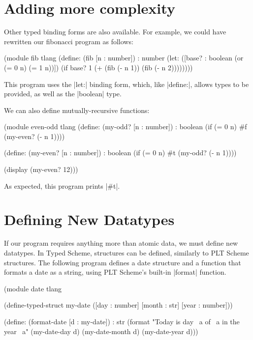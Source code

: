 \documentclass{book}
\begin{document}
\begin{schemeregion}
\section{Adding more complexity}



Other typed binding forms are also available.  For example, we could have
rewritten our fibonacci program as follows:

\begin{schemedisplay}
(module fib tlang
  (define: (fib [n : number]) : number
    (let: ([base? : boolean (or (= 0 n) (= 1 n))])
      (if base? 1
          (+ (fib (- n 1)) (fib (- n 2))))))))
\end{schemedisplay} 

This program uses the \scheme|let:| binding form, which, like
\scheme|define:|, allows types to be provided, as well as the
\scheme|boolean| type.

We can also define mutually-recursive functions:

\begin{schemedisplay}
(module even-odd tlang
  (define: (my-odd? [n : number]) : boolean
    (if (= 0 n) #f
        (my-even? (- n 1))))

  (define: (my-even? [n : number]) : boolean
    (if (= 0 n) #t
        (my-odd? (- n 1))))

  (display (my-even? 12)))
\end{schemedisplay} 

As expected, this program prints \schemeresult|#t|.

\section{Defining New Datatypes}

If our program requires anything more than atomic data, we must define
new datatypes.  In Typed Scheme, structures can be defined, similarly
to PLT Scheme structures.  The following program defines a date
structure and a function that formats a date as a string, using PLT
Scheme's built-in \scheme|format| function.

\begin{schemedisplay}
(module date tlang

  (define-typed-struct my-date ([day : number] [month : str] [year : number]))
  
  (define: (format-date [d : my-date]) : str
    (format "Today is day ~a of ~a in the year ~a" (my-date-day d) (my-date-month d) (my-date-year d)))
  

\end{schemedisplay}
\end{schemeregion}
\end{document}
